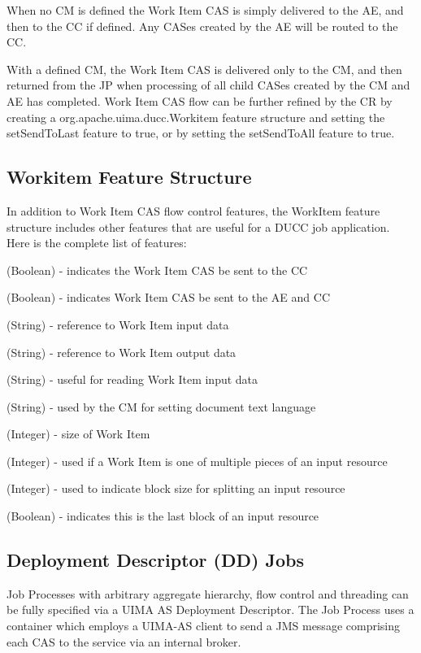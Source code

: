 When no CM is defined the Work Item CAS is simply delivered to the AE, and then to the CC if defined. 
Any CASes created by the AE will be routed to the CC.

With a defined CM, the Work Item CAS is delivered only to the CM, and then returned from the JP when processing
of all child CASes created by the CM and AE has completed. Work Item CAS flow can be further refined by the CR by
creating a org.apache.uima.ducc.Workitem feature structure and setting the setSendToLast feature to true,
or by setting the setSendToAll feature to true.

\subsection{Workitem Feature Structure}
In addition to Work Item CAS flow control features, the WorkItem feature structure includes other features that are useful
for a DUCC job application. Here is the complete list of features:

\begin{description}[labelindent=0.5in,leftmargin=0.5in]
  \item[sendToLast] (Boolean) - indicates the Work Item CAS be sent to the CC
  \item[sendToAll] (Boolean) - indicates Work Item CAS be sent to the AE and CC
  \item[inputspec] (String) - reference to Work Item input data
  \item[outputspec] (String) - reference to Work Item output data
  \item[encoding] (String) - useful for reading Work Item input data
  \item[language] (String) - used by the CM for setting document text language
  \item[bytelength] (Integer) - size of Work Item
  \item[blockindex] (Integer) - used if a Work Item is one of multiple pieces of an input resource
  \item[blocksize] (Integer) - used to indicate block size for splitting an input resource
  \item[lastBlock] (Boolean) - indicates this is the last block of an input resource
\end{description}

\subsection{Deployment Descriptor (DD) Jobs}
Job Processes with arbitrary aggregate hierarchy, flow control and threading can be fully specified
via a UIMA AS Deployment Descriptor. 
The Job Process uses a container which employs a UIMA-AS client to send a JMS message comprising
each CAS to the service via an internal broker.

